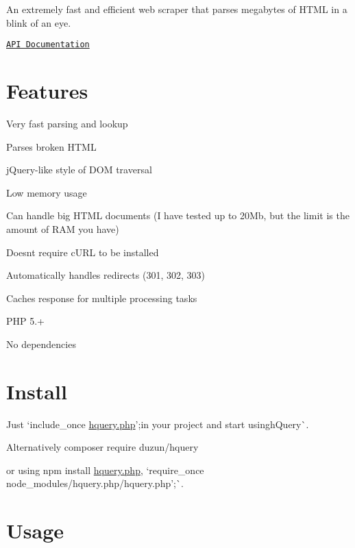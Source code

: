 An extremely fast and efficient web scraper that parses megabytes of H\+T\+ML in a blink of an eye.

\href{https://duzun.github.io/hQuery.php/docs/class-hQuery.html}{\tt A\+PI Documentation}

\section*{Features}


\begin{DoxyItemize}
\item Very fast parsing and lookup
\item Parses broken H\+T\+ML
\item j\+Query-\/like style of D\+OM traversal
\item Low memory usage
\item Can handle big H\+T\+ML documents (I have tested up to 20\+Mb, but the limit is the amount of R\+AM you have)
\item Doesn\textquotesingle{}t require c\+U\+RL to be installed
\item Automatically handles redirects (301, 302, 303)
\item Caches response for multiple processing tasks
\item P\+HP 5.+
\item No dependencies
\end{DoxyItemize}

\section*{Install}

Just `include\+\_\+once \textquotesingle{}\mbox{\hyperlink{hquery_8php_source}{hquery.\+php}}';{\ttfamily in your project and start using}h\+Query\`{}.

Alternatively {\ttfamily composer require duzun/hquery}

or using {\ttfamily npm install \mbox{\hyperlink{hquery_8php_source}{hquery.\+php}}}, `require\+\_\+once \textquotesingle{}node\+\_\+modules/hquery.\+php/hquery.php';\`{}.

\section*{Usage}

